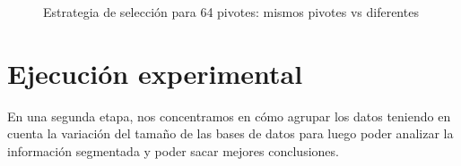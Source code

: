 \begin{figure}[H]
\centering
{}
		\caption{\small Estrategia de selecci\'on para 64 pivotes: mismos pivotes vs diferentes}
		\label{fig:same-vs-diff-64Pivotes}
\end{figure}

\begin{comment} 

\begin{figure}[H]
	\begin{center}
		\texttt{[image: imagenes/same\_vs\_different/16p\_incremental.eps]}
		\caption{\small Estrategia de selecci\'on incremental para 16 pivotes: mismos pivotes vs diferentes}
		\label{fig:same-vs-diff-Incremental-16Pivotes}

		\texttt{[image: imagenes/same\_vs\_different/16p\_random.eps]}
		\caption{\small Estrategia de selecci\'on random para 16 pivotes: mismos pivotes vs diferentes}
		\label{fig:same-vs-diff-random-16Pivotes}	

		\texttt{[image: imagenes/same\_vs\_different/64p\_incremental.eps]}
		\caption{\small Estrategia de selecci\'on incremental para 64 pivotes: mismos pivotes vs diferentes}
		\label{fig:same-vs-diff-Incremental-64Pivotes}
		
		\texttt{[image: imagenes/same\_vs\_different/16p\_random.eps]}
		\caption{\small Estrategia de selecci\'on random para 64 pivotes: mismos pivotes vs diferentes}
		\label{fig:same-vs-diff-random-64Pivotes}
	\end{center}
\end{figure}

\end{comment}

\section{Ejecuci\'on experimental}

En una segunda etapa,  nos concentramos en c\'omo agrupar los datos teniendo en cuenta la variaci\'on del tama\~no de las bases de datos para luego poder analizar la informaci\'on segmentada y poder sacar mejores conclusiones.\\


